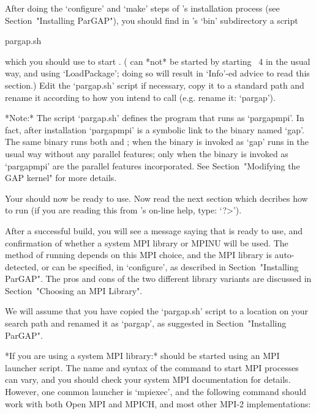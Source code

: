 After doing the `configure' and `make' steps of {\ParGAP}'s  installation
process (see Section~"Installing ParGAP"), you should find in {\ParGAP}'s
`bin' subdirectory a script

\begintt
pargap.sh
\endtt

which you should use to start {\ParGAP}. ({\ParGAP} can *not* be  started
by starting {\GAP}~4 in the usual way, and using `LoadPackage';  doing
so will result in `Info'-ed  advice  to  read  this  section.)  Edit  the
`pargap.sh' script if necessary, copy it to a standard path and rename it
according to how you intend to call {\ParGAP} (e.g. rename it: `pargap').

*Note:*
The script  `pargap.sh'  defines  the  program  that  runs  {\ParGAP}  as
`pargapmpi'. In fact, after installation `pargapmpi' is a  symbolic  link
to the {\GAP} binary named `gap'. The same binary runs  both  {\GAP}  and
{\ParGAP}; when the binary is invoked as `gap' {\GAP} runs in  the  usual
way without any parallel features; only when the  binary  is  invoked  as
`pargapmpi'    are    the    parallel    features    incorporated.    See
Section~"Modifying the GAP kernel" for more details.

Your {\ParGAP} should now be ready to use.  Now  read  the  next  section
which decribes how to  run  {\ParGAP}  (if  you  are  reading  this  from
{\GAP}'s on-line help, type: `?>').


After a successful build, you will see a message saying that {\ParGAP} is
ready to use, and confirmation of whether a system MPI library or MPINU will 
be used. The method of running {\ParGAP} depends on this MPI choice, and the 
MPI library is auto-detected, or can be specified, in `configure', as 
described in Section~"Installing ParGAP". The pros and cons of the two 
different library variants are discussed in Section~"Choosing an MPI Library".

We will assume that you have copied the `pargap.sh' script to a location
on your search path and renamed it as `pargap', as suggested in 
Section~"Installing ParGAP".

*If you are using a system MPI library:*
{\ParGAP} should be started using an MPI launcher script. The name and syntax
of the command to start MPI processes can vary, and you should check your 
system MPI documentation for details. However, one common launcher is 
`mpiexec', and the following command should work with both Open MPI and MPICH,
and most other MPI-2 implementations:

